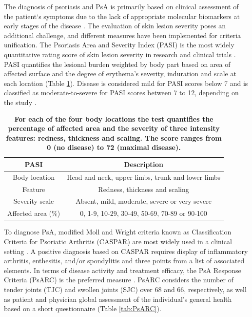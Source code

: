 The diagnosis of psoriasis and PsA is primarily based on clinical assessment of the patient`s symptoms due to the lack of appropriate molecular biomarkers at early stages of the disease \parencite{Villanova2013}. The evaluation of skin lesion severity poses an additional challenge, and different measures have been implemented for criteria unification. The Psoriasis Area and Severity Index (PASI) is the most widely quantitative rating score of skin lesion severity in research and clinical trials \parencite{Fredriksson1978,Finlay2005}. PASI quantifies the lesional burden weighted by body part based on area of affected surface and the degree of erythema’s severity, induration and scale at each location (Table \ref{tab:PASI}). Disease is considered mild for PASI scores below 7 and is classified as moderate-to-severe for PASI scores between 7 to 12, depending on the study \parencite{Finlay2005, Schmitt2005,Langewouters2008}.


\begin{table}[htbp]
\setlength{\tabcolsep}{20pt}
\renewcommand{\arraystretch}{1.5}
\begin{tabular}{@{} c c}
\toprule
\textbf{PASI} & \textbf{Description} \\
\midrule
\midrule
Body location  & Head and neck, upper limbs, trunk and lower limbs\\
Feature        & Redness, thickness and scaling \\
Severity scale & Absent, mild, moderate, severe or very severe \\
Affected area (\%)  & 0, 1-9, 10-29, 30-49, 50-69, 70-89 or 90-100 \\
\bottomrule
\end{tabular}
\medskip %
\caption[Variables and scoring used in the Psoriasis Area and Severity Index (PASI)]{\textbf{For each of the four body locations the test quantifies the percentage of affected area and the severity of three intensity features: redness, thickness and scaling. The score ranges from 0 (no disease) to 72 (maximal disease).}}
\label{tab:PASI}
\end{table}
\bigskip %


To diagnose PsA, modified Moll and Wright criteria known as Classification Criteria for Psoriatic Arthritis (CASPAR) are most widely used in a clinical setting \parencite {Taylor2006}. A positive diagnosis based on CASPAR requires display of inflammatory arthritis, enthesitis, and/or spondylitis and three points from a list of associated elements. In terms of disease activity and treatment efficacy, the PsA Response Criteria (PsARC) is the preferred measure \parencite{Mease2011,Clegg1996}. PsARC considers the number of tender joints (TJC) and swollen joints (SJC) over 68 and 66, respectively, as well as patient and physician global assessment of the individual's general health based on a short questionnaire (Table \ref{tab:PsARC}). 

